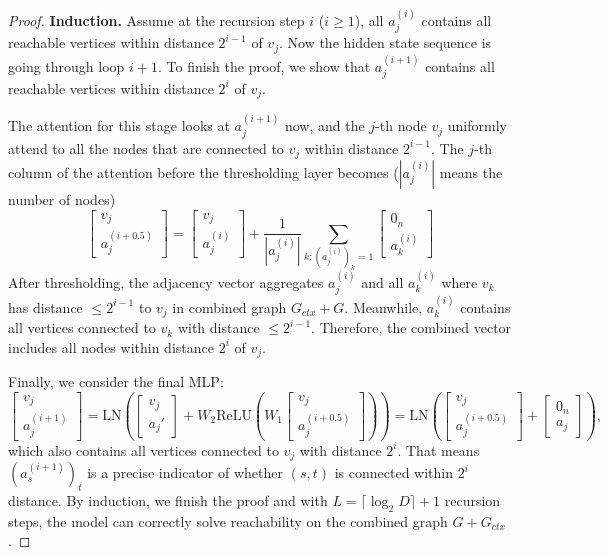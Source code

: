 \documentclass[]{bytedance_seed}
\newcommand{\1}{\mathbf{1}}
\begin{document}
{\begin{proof}
\textbf{Induction.} Assume at the recursion step $i$ ($i\ge 1$), all $a_{j}^{(i)}$ contains all reachable vertices within distance $2^{i-1}$ of $v_j$. Now the hidden state sequence is going through loop $i+1$. To finish the proof, we show that $a_{j}^{(i+1)}$ contains all reachable vertices within distance $2^{i}$ of $v_j$.

The attention for this stage looks at $a_{j}^{(i+1)}$ now, and the $j$-th node $v_j$ uniformly attend to all the nodes that are connected to $v_j$ within distance $2^{i-1}$. The $j$-th column of the attention before the thresholding layer becomes ($|a_{j}^{(i)}|$ means the number of nodes)
    $$\begin{bmatrix}
        v_j\\
        a_{j}^{(i+0.5)}
    \end{bmatrix}=\begin{bmatrix}
        v_j\\
        a_{j}^{(i)}
    \end{bmatrix}+\frac{1}{|a_{j}^{(i)}|}\sum_{k:(a_{j}^{(i)})_k=1}\begin{bmatrix}
        0_n\\
        a_{k}^{(i)}
    \end{bmatrix}$$
    After thresholding, the adjacency vector aggregates $a_j^{(i)}$ and all $a_k^{(i)}$ where $v_k$ has distance $\le 2^{i-1}$ to $v_j$ in combined graph $G_{ctx}+G$. Meanwhile, $a_k^{(i)}$ contains all vertices connected to $v_k$ with distance $\le 2^{i-1}$. Therefore, the combined vector includes all nodes within distance $2^{i}$ of $v_j$.

    Finally, we consider the final MLP:
    $$\begin{bmatrix}
        v_j\\
        a_{j}^{(i+1)}
    \end{bmatrix}=\mathrm{LN}\left(\begin{bmatrix}
        v_j\\
        a_{j}'
    \end{bmatrix}+W_2\mathrm{ReLU}\left(W_1\begin{bmatrix}
        v_j\\
        a_{j}^{(i+0.5)}
    \end{bmatrix}\right)\right)=\mathrm{LN}\left(\begin{bmatrix}
        v_j\\
        a_{j}^{(i+0.5)}
    \end{bmatrix}+\begin{bmatrix}
        0_n\\
        a_{j}
    \end{bmatrix}\right),$$ which also contains all vertices connected to $v_j$ with distance $2^i$. That means $(a_{s}^{(i+1)})_t$ is a precise indicator of whether $(s,t)$ is connected within $2^i$ distance. By induction, we finish the proof and with $L=\lceil\log_2 D\rceil+1$ recursion steps, the model can correctly solve reachability on the combined graph $G+G_{ctx}$.
\end{proof}

}
\end{document}
